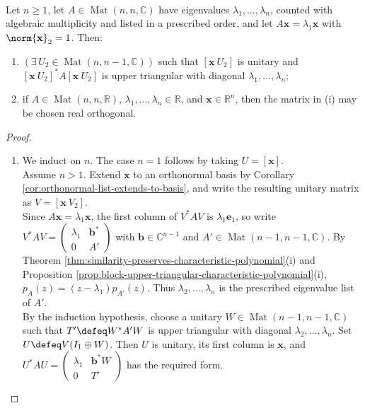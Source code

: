 \begin{theorem} \label{thm:matrix-schur-triangularization-ordered} \\
Let $n\geq1$, let $A\in\operatorname{Mat}(n,n,\mathbb{C})$ have eigenvalues $\lambda_1,\ldots,\lambda_n$, counted with algebraic multiplicity and listed in a prescribed order, and let $A\mathbf{x}=\lambda_1\mathbf{x}$ with $\norm{\mathbf{x}}_2=1$. Then:
\begin{enumerate}[label=(\roman*)]
\setlength{\itemsep}{0pt}
\item $(\exists\,U_2\in\operatorname{Mat}(n,n-1,\mathbb{C}))$ such that $[\mathbf{x}\ U_2]$ is unitary and $[\mathbf{x}\ U_2]^*A[\mathbf{x}\ U_2]$ is upper triangular with diagonal $\lambda_1,\ldots,\lambda_n$;
\item if $A\in\operatorname{Mat}(n,n,\mathbb{R})$, $\lambda_1,\ldots,\lambda_n\in\mathbb{R}$, and $\mathbf{x}\in\mathbb{R}^n$, then the matrix in (i) may be chosen real orthogonal.
\end{enumerate}
\begin{proof}
\begin{enumerate}[label=(\roman*)]
\setlength{\itemsep}{0pt}
\item We induct on $n$. The case $n=1$ follows by taking $U=[\mathbf{x}]$.\\
Assume $n>1$. Extend $\mathbf{x}$ to an orthonormal basis by Corollary \ref{cor:orthonormal-list-extends-to-basis}, and write the resulting unitary matrix as $V=[\mathbf{x}\ V_2]$.\\
Since $A\mathbf{x}=\lambda_1\mathbf{x}$, the first column of $V^*AV$ is $\lambda_1\mathbf{e}_1$, so write $V^*AV=\left(\begin{smallmatrix}\lambda_1&\mathbf{b}^*\\0&A'\end{smallmatrix}\right)$ with $\mathbf{b}\in\mathbb{C}^{n-1}$ and $A'\in\operatorname{Mat}(n-1,n-1,\mathbb{C})$. By Theorem \ref{thm:similarity-preserves-characteristic-polynomial}(i) and Proposition \ref{prop:block-upper-triangular-characteristic-polynomial}(i), $p_A(z)=(z-\lambda_1)p_{A'}(z)$. Thus $\lambda_2,\ldots,\lambda_n$ is the prescribed eigenvalue list of $A'$.\\
By the induction hypothesis, choose a unitary $W\in\operatorname{Mat}(n-1,n-1,\mathbb{C})$ such that $T'\defeq W^*A'W$ is upper triangular with diagonal $\lambda_2,\ldots,\lambda_n$. Set $U\defeq V(I_1\oplus W)$. Then $U$ is unitary, its first column is $\mathbf{x}$, and $U^*AU=\left(\begin{smallmatrix}\lambda_1&\mathbf{b}^*W\\0&T'\end{smallmatrix}\right)$ has the required form.

\end{enumerate}
\end{proof}
\end{theorem}
